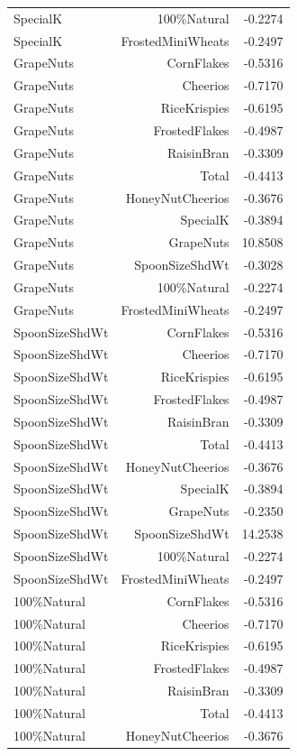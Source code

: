 \begin{longtable}{@{}lrr@{}}
SpecialK & 100\%Natural & -0.2274 \\
SpecialK & FrostedMiniWheats & -0.2497 \\
GrapeNuts & CornFlakes & -0.5316 \\
GrapeNuts & Cheerios & -0.7170 \\
GrapeNuts & RiceKrispies & -0.6195 \\
GrapeNuts & FrostedFlakes & -0.4987 \\
GrapeNuts & RaisinBran & -0.3309 \\
GrapeNuts & Total & -0.4413 \\
GrapeNuts & HoneyNutCheerios & -0.3676 \\
GrapeNuts & SpecialK & -0.3894 \\
GrapeNuts & GrapeNuts & 10.8508 \\
GrapeNuts & SpoonSizeShdWt & -0.3028 \\
GrapeNuts & 100\%Natural & -0.2274 \\
GrapeNuts & FrostedMiniWheats & -0.2497 \\
SpoonSizeShdWt & CornFlakes & -0.5316 \\
SpoonSizeShdWt & Cheerios & -0.7170 \\
SpoonSizeShdWt & RiceKrispies & -0.6195 \\
SpoonSizeShdWt & FrostedFlakes & -0.4987 \\
SpoonSizeShdWt & RaisinBran & -0.3309 \\
SpoonSizeShdWt & Total & -0.4413 \\
SpoonSizeShdWt & HoneyNutCheerios & -0.3676 \\
SpoonSizeShdWt & SpecialK & -0.3894 \\
SpoonSizeShdWt & GrapeNuts & -0.2350 \\
SpoonSizeShdWt & SpoonSizeShdWt & 14.2538 \\
SpoonSizeShdWt & 100\%Natural & -0.2274 \\
SpoonSizeShdWt & FrostedMiniWheats & -0.2497 \\
100\%Natural & CornFlakes & -0.5316 \\
100\%Natural & Cheerios & -0.7170 \\
100\%Natural & RiceKrispies & -0.6195 \\
100\%Natural & FrostedFlakes & -0.4987 \\
100\%Natural & RaisinBran & -0.3309 \\
100\%Natural & Total & -0.4413 \\
100\%Natural & HoneyNutCheerios & -0.3676 \\

\end{longtable}
